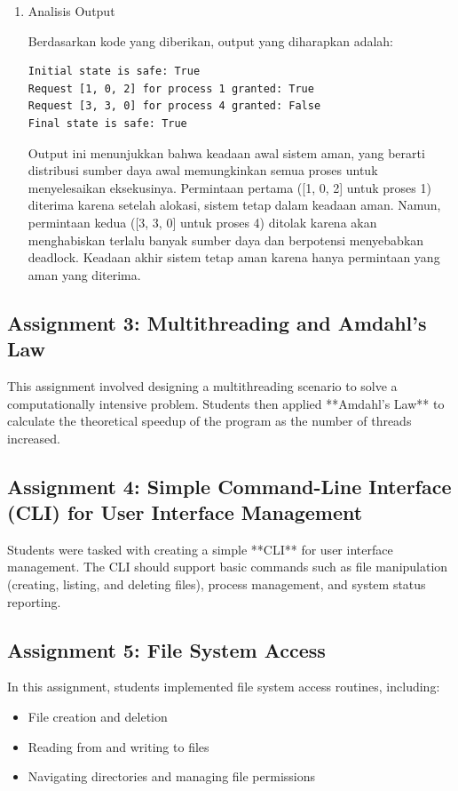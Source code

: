 \documentclass[12pt]{article}
\begin{document}
\begin{enumerate}
\item Analisis Output

Berdasarkan kode yang diberikan, output yang diharapkan adalah:

\begin{verbatim}
Initial state is safe: True
Request [1, 0, 2] for process 1 granted: True
Request [3, 3, 0] for process 4 granted: False
Final state is safe: True
\end{verbatim}

Output ini menunjukkan bahwa keadaan awal sistem aman, yang berarti distribusi sumber daya awal memungkinkan semua proses untuk menyelesaikan eksekusinya. Permintaan pertama ([1, 0, 2] untuk proses 1) diterima karena setelah alokasi, sistem tetap dalam keadaan aman. Namun, permintaan kedua ([3, 3, 0] untuk proses 4) ditolak karena akan menghabiskan terlalu banyak sumber daya dan berpotensi menyebabkan deadlock. Keadaan akhir sistem tetap aman karena hanya permintaan yang aman yang diterima.
\end{enumerate}


\subsection{Assignment 3: Multithreading and Amdahl's Law}
This assignment involved designing a multithreading scenario to solve a
computationally intensive problem. Students then applied **Amdahl's Law** to
calculate the theoretical speedup of the program as the number of threads
increased.

\subsection{Assignment 4: Simple Command-Line Interface (CLI) for User Interface Management}
Students were tasked with creating a simple **CLI** for user interface
management. The CLI should support basic commands such as file manipulation
(creating, listing, and deleting files), process management, and system status
reporting.

\subsection{Assignment 5: File System Access}
In this assignment, students implemented file system access routines,
including:
\begin{itemize}
    \item File creation and deletion
    \item Reading from and writing to files
    \item Navigating directories and managing file permissions
\end{itemize}
\end{document}

